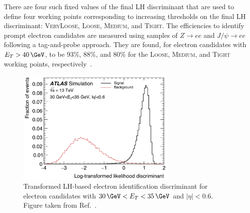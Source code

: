 There are four such fixed values of the final LH discriminant that are used to define
four working points corresponding to increasing thresholds on the final LH discriminant:
\textsc{VeryLoose}, \textsc{Loose}, \textsc{Medium}, and \textsc{Tight}.
The efficiencies to identify prompt electron candidates are measured using samples of $Z\rightarrow ee$ and
$J/\psi \rightarrow ee$ following a tag-and-probe approach.
They are found, for electron candidates with $E_T > 40\,\GeV$,
to be 93\%, 88\%, and 80\% for the \textsc{Loose}, \textsc{Medium}, and \textsc{Tight} working points, respectively~\cite{Aad:2019tso}.

\begin{figure}[!htb]
    \begin{center}
    \includegraphics[width=0.7\textwidth]{figures/chapter3/egamma/egamma_lh_discriminant}
    \caption{
        Transformed LH-based electron identification discriminant for electron candidates
        with $30\,\GeV < E_T < 35\,\GeV$ and $\lvert \eta \rvert < 0.6$.
        Figure taken from Ref.~\cite{Aaboud:2657964}.
    }
    \label{fig:egamma_lh_discriminant}
    \end{center}
\end{figure}


\FloatBarrier

